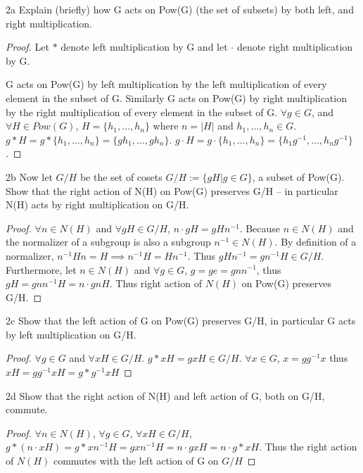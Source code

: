 \documentclass{article}
\begin{document}
\begin{PROB}{2a}\label{Problem 2a.}
    Explain (briefly) how G acts on Pow(G) (the set of subsets) by both left, and right multiplication.
\end{PROB}
\begin{proof}
    Let $\ast$ denote left multiplication by G and let $\cdot$ denote right multiplication by G.
    
    G acts on Pow(G) by left multiplication by the left multiplication of every element in the subset of G. Similarly G acts on Pow(G) by right multiplication by the right multiplication of every element in the subset of G. $\forall g \in G$, and $\forall H \in Pow(G)$, $H = \{h_1, \ldots, h_n\}$ where $n = |H|$ and $h_1, \ldots, h_n \in G$. $g \ast H = g \ast \{h_1, \ldots, h_n\} = \{gh_1, \ldots, gh_n\}$. $g \cdot H = g \cdot \{h_1, \ldots, h_n\} = \{h_1 g^{-1}, \ldots, h_n g^{-1} \}$.
\end{proof}
\begin{PROB}{2b}\label{Problem 2b.}
    Now let $G/H$ be the set of cosets $G/H := \{ gH| g \in G \}$, a subset of Pow(G). Show that the right action of N(H) on Pow(G) preserves G/H -- in particular N(H) acts by right multiplication on G/H.
\end{PROB}
\begin{proof}
    $\forall n \in N(H)$ and $\forall gH \in G/H$, $n \cdot gH = gHn^{-1}$. Because $n \in N(H)$ and the normalizer of a subgroup is also a subgroup $n^{-1} \in N(H)$. By definition of a normalizer, $n^{-1}Hn = H \implies n^{-1}H = Hn^{-1}$. Thus $gHn^{-1} = gn^{-1}H \in G/H$. Furthermore, let $n \in N(H)$ and $\forall g \in G$, $g = ge = gnn^{-1}$, thus $gH = gnn^{-1}H = n \cdot gnH$. Thus right action of $N(H)$ on Pow(G) preserves G/H.
\end{proof}
\begin{PROB}{2c}\label{Problem 2c.}
    Show that the left action of G on Pow(G) preserves G/H, in particular G acts by left multiplication on G/H. 
\end{PROB}
\begin{proof}
    $\forall g \in G$ and $\forall xH \in G/H$. $g \ast xH = gxH \in G/H$. $\forall x \in G$, $x = gg^{-1}x$ thus $xH = gg^{-1}xH = g \ast g^{-1}xH$
\end{proof}
\begin{PROB}{2d}\label{Problem 2d.}
    Show that the right action of N(H) and left action of G, both on G/H, commute.
\end{PROB}
\begin{proof}
    $\forall n \in N(H)$, $\forall g \in G$, $\forall xH \in G/H$, $g \ast (n \cdot xH) = g \ast xn^{-1}H = gxn^{-1}H = n \cdot gxH = n \cdot g \ast xH$. Thus the right action of $N(H)$ commutes with the left action of G on $G/H$
\end{proof}
\end{document}
